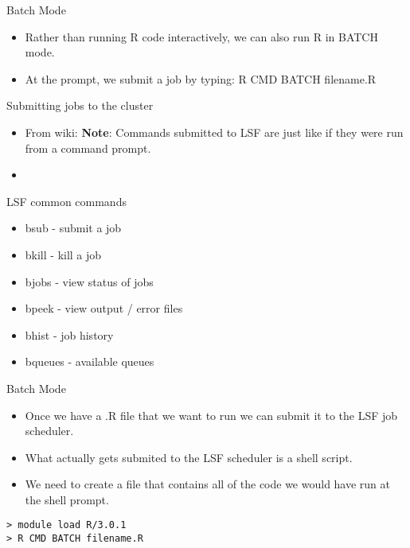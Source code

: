 \begin{frame}{Batch Mode}
\begin{itemize}
\item Rather than running R code interactively, we can also run R in BATCH mode.  
\item At the prompt, we submit a job by typing: R CMD BATCH filename.R
\end{itemize}
\end{frame}

\begin{frame}{Submitting jobs to the cluster}
\begin{itemize}
\item From wiki: {\bf Note}: Commands submitted to LSF are just like if they were run from a command prompt. 
\item 
\end{itemize}
\end{frame}


\begin{frame}{LSF common commands}
\begin{itemize}
\item bsub - submit a job
\item bkill - kill a job
\item bjobs - view status of jobs
\item bpeek - view output / error files
\item bhist - job history
\item bqueues - available queues
\end{itemize}
\end{frame}







\begin{frame}{Batch Mode}
\begin{itemize}
\item Once we have a .R file that we want to run we can submit it to the LSF job scheduler.  
\item What actually gets submited to the LSF scheduler is a shell script.  
\item We need to create a file that contains all of the code we would have run at the shell prompt.  
\end{itemize}
{\tt > module load R/3.0.1 }\\
{\tt > R CMD BATCH filename.R}\\
\end{frame}




